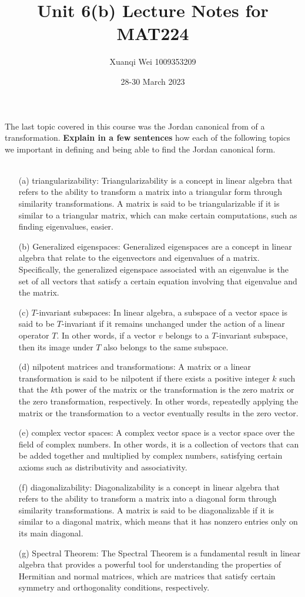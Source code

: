 \documentclass[fontsize=12pt]{scrartcl}
\title{Unit 6(b) Lecture Notes for MAT224}
\author{Xuanqi Wei 1009353209}
\date{28-30 March 2023}
\begin{document}
\maketitle

\noindent
The last topic covered in this course was the Jordan canonical from of a transformation. \textbf{Explain in a few sentences} how each of the following topics we important in defining and being able to find the Jordan canonical form.\\
\\
\begin{itemize}
    \item[(a)] triangularizability: Triangularizability is a concept in linear algebra that refers to the ability to transform a matrix into a triangular form through similarity transformations. A matrix is said to be triangularizable if it is similar to a triangular matrix, which can make certain computations, such as finding eigenvalues, easier.
    \item[(b)] Generalized eigenspaces: Generalized eigenspaces are a concept in linear algebra that relate to the eigenvectors and eigenvalues of a matrix. Specifically, the generalized eigenspace associated with an eigenvalue is the set of all vectors that satisfy a certain equation involving that eigenvalue and the matrix. 
    \item[(c)] $T$-invariant subspaces: In linear algebra, a subspace of a vector space is said to be $T$-invariant if it remains unchanged under the action of a linear operator $T$. In other words, if a vector $v$ belongs to a $T$-invariant subspace, then its image under $T$ also belongs to the same subspace. 
    \item[(d)] nilpotent matrices and transformations: A matrix or a linear transformation is said to be nilpotent if there exists a positive integer $k$ such that the $k$th power of the matrix or the transformation is the zero matrix or the zero transformation, respectively. In other words, repeatedly applying the matrix or the transformation to a vector eventually results in the zero vector.
    \item[(e)] complex vector spaces: A complex vector space is a vector space over the field of complex numbers. In other words, it is a collection of vectors that can be added together and multiplied by complex numbers, satisfying certain axioms such as distributivity and associativity.
    \item[(f)] diagonalizability: Diagonalizability is a concept in linear algebra that refers to the ability to transform a matrix into a diagonal form through similarity transformations. A matrix is said to be diagonalizable if it is similar to a diagonal matrix, which means that it has nonzero entries only on its main diagonal.
    \item[(g)] Spectral Theorem: The Spectral Theorem is a fundamental result in linear algebra that provides a powerful tool for understanding the properties of Hermitian and normal matrices, which are matrices that satisfy certain symmetry and orthogonality conditions, respectively.


\end{itemize}
\end{document}
